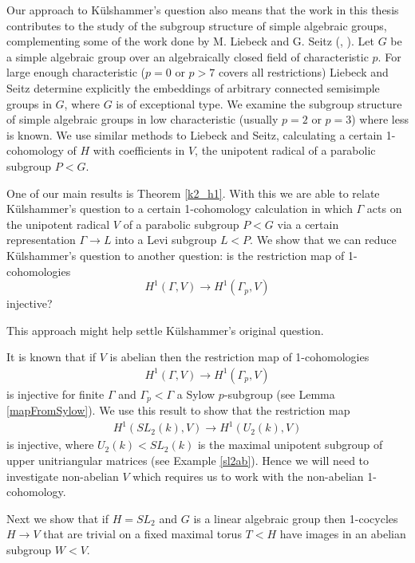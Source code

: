 Our approach to K\"ulshammer's question also means that the work in this thesis contributes to the study of the subgroup structure of simple algebraic groups, complementing some of the work done by M. Liebeck and G. Seitz (\cite{liebeck1996reductive}, \cite{liebeck2004maximal}). Let $G$ be a simple algebraic group over an algebraically closed field of characteristic $p$. For large enough characteristic ($p=0$ or $p>7$ covers all restrictions) Liebeck and Seitz determine explicitly the embeddings of arbitrary connected semisimple groups in $G$, where $G$ is of exceptional type. We examine the subgroup structure of simple algebraic groups in low characteristic (usually $p=2$ or $p=3$) where less is known. We use similar methods to Liebeck and Seitz, calculating a certain 1-cohomology of $H$ with coefficients in $V$, the unipotent radical of a parabolic subgroup $P < G$.


One of our main results is Theorem \ref{k2_h1}. With this we are able to relate K\"ulshammer's question to a certain 1-cohomology calculation in which $\Gamma$ acts on the unipotent radical $V$ of a parabolic subgroup $P < G$ via a certain representation $\Gamma \rightarrow L$ into a Levi subgroup $L < P$. We show that we can reduce K\"ulshammer's question to another question: is the restriction map of 1-cohomologies
\begin{displaymath}
  H^1(\Gamma, V) \rightarrow H^1(\Gamma_p, V)
\end{displaymath}
injective?


This approach might help settle K\"ulshammer's original question.


It is known that if $V$ is abelian then the restriction map of 1-cohomologies
\begin{eqnarray*}
  H^1(\Gamma, V)\rightarrow H^1(\Gamma_p, V)
\end{eqnarray*}
is injective for finite $\Gamma$ and $\Gamma_p < \Gamma$ a Sylow $p$-subgroup (see Lemma \ref{mapFromSylow}). We use this result to show that the restriction map
\begin{eqnarray*}
  H^1(SL_2(k), V) \rightarrow H^1(U_2(k), V)
\end{eqnarray*}
is injective, where $U_2(k) < SL_2(k)$ is the maximal unipotent subgroup of upper unitriangular matrices (see Example \ref{sl2ab}). Hence we will need to investigate non-abelian $V$ which requires us to work with the non-abelian 1-cohomology.


Next we show that if $H = SL_2$ and $G$ is a linear algebraic group then 1-cocycles $H\rightarrow V$ that are trivial on a fixed maximal torus $T < H$ have images in an abelian subgroup $W < V$.
		
